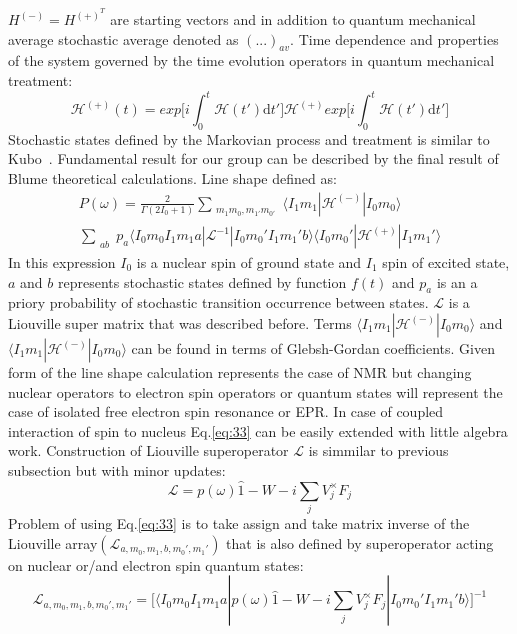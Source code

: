 $H^{(-)}=H^{(+)^T}$ are starting vectors and in addition to quantum mechanical average stochastic average denoted as $(...)_{av}$. Time dependence and properties of the system governed by the time evolution operators in quantum mechanical treatment: 
\begin{equation}\label{eq:32}
\mathcal{H}^{(+)}(t)= exp\Bigg[i\int_0^t\mathcal{H}(t')\mathrm{d}t'\Bigg]\mathcal{H}^{(+)}exp\Bigg[i\int_0^t\mathcal{H}(t')\mathrm{d}t'\Bigg]
\end{equation}  
Stochastic states defined by the Markovian process and treatment is similar to Kubo~\cite{kubo1}. Fundamental result for our group can be described by the final result of Blume theoretical calculations. Line shape defined as: 
\begin{multline}\label{eq:33}
P(\omega)=
\frac{2}{\Gamma(2I_0+1)}\sum_{\substack{m_1m_0,m_{1'}m_{0'}}}\langle I_1m_1|\mathcal{H}^{(-)}|I_0m_0\rangle\\\sum_{\substack{ab}}p_a\langle I_0m_0I_1m_1a|\mathcal{L}^{-1}|I_0m_0'I_1m_1'b\rangle \langle I_0m_0'|\mathcal{H}^{(+)}|I_1m_1'\rangle
\end{multline}
In this expression $I_0$ is a nuclear spin of ground state and $I_1$ spin of excited state,$a$ and $b$ represents stochastic states defined by function $f(t)$ and $p_a$ is an a priory probability of stochastic transition occurrence between states. $\mathcal{L}$ is a Liouville super matrix that was described before. Terms 
$\langle I_1m_1|\mathcal{H}^{(-)}|I_0m_0\rangle $ and $\langle I_1m_1|\mathcal{H}^{(-)}|I_0m_0\rangle $ can be found in terms of Glebsh-Gordan coefficients. Given form of the line shape calculation represents the case of NMR but changing nuclear operators to electron spin operators or quantum states will represent the case of isolated free electron spin resonance or EPR. In case of coupled interaction of spin to nucleus Eq.\ref{eq:33} can be easily extended with little algebra work. Construction of Liouville superoperator $\mathcal{L}$ is simmilar to previous subsection but with minor updates: 
\begin{equation}\label{eq:34}
\mathcal{L}=p(\omega)\hat1 - W-i\sum_jV_j^{\times} F_j
\end{equation}
Problem of using Eq.\ref{eq:33} is to take assign and take matrix inverse of the Liouville array$(\mathcal{L}_{a,m_0,m_1,b,m_0',m_1'})$ that is also defined by superoperator acting on nuclear or/and electron spin quantum states: 
\begin{equation}\label{eq:35}
\mathcal{L}_{a,m_0,m_1,b,m_0',m_1'}=\Big[\langle I_0m_0I_1m_1a|p(\omega)\hat1 - W-i\sum_jV_j^{\times} F_j|I_0m_0'I_1m_1'b\rangle\Big]^{-1}  
\end{equation}
